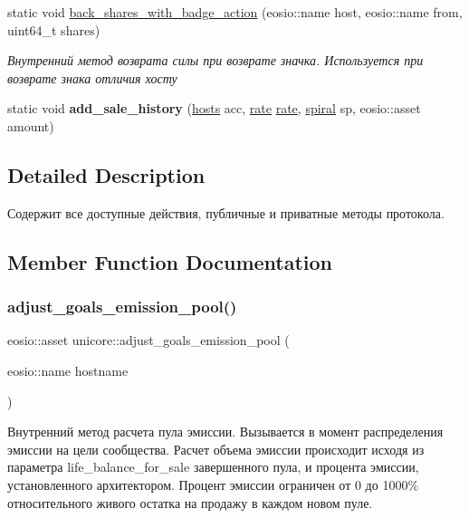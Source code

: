 \begin{DoxyCompactItemize}
static void \mbox{\hyperlink{classunicore_aa78e3ba614a74bf7edd3fdfa0b048b23}{back\+\_\+shares\+\_\+with\+\_\+badge\+\_\+action}} (eosio\+::name host, eosio\+::name from, uint64\+\_\+t shares)
\begin{DoxyCompactList}\small\item\em Внутренний метод возврата силы при возврате значка. Используется при возврате знака отличия хосту \end{DoxyCompactList}\item 
\mbox{\label{classunicore_ad58e00b35b02b50991c8fdb0307ce3c1}} 
static void {\bfseries add\+\_\+sale\+\_\+history} (\mbox{\hyperlink{structhosts}{hosts}} acc, \mbox{\hyperlink{structrate}{rate}} \mbox{\hyperlink{structrate}{rate}}, \mbox{\hyperlink{structspiral}{spiral}} sp, eosio\+::asset amount)
\end{DoxyCompactItemize}


\subsection{Detailed Description}
Содержит все доступные действия, публичные и приватные методы протокола. 

\subsection{Member Function Documentation}
\mbox{\label{classunicore_ae4010919890b14f831b4d4a633771062}} 
\subsubsection{\texorpdfstring{adjust\+\_\+goals\+\_\+emission\+\_\+pool()}{adjust\_goals\_emission\_pool()}}
{\footnotesize\ttfamily eosio\+::asset unicore\+::adjust\+\_\+goals\+\_\+emission\+\_\+pool (\begin{DoxyParamCaption}\item[{eosio\+::name}]{hostname }\end{DoxyParamCaption})\hspace{0.3cm}{\ttfamily [static]}}



Внутренний метод расчета пула эмиссии. Вызывается в момент распределения эмиссии на цели сообщества. Расчет объема эмиссии происходит исходя из параметра life\+\_\+balance\+\_\+for\+\_\+sale завершенного пула, и процента эмиссии, установленного архитектором. Процент эмиссии ограничен от 0 до 1000\% относительного живого остатка на продажу в каждом новом пуле. 


